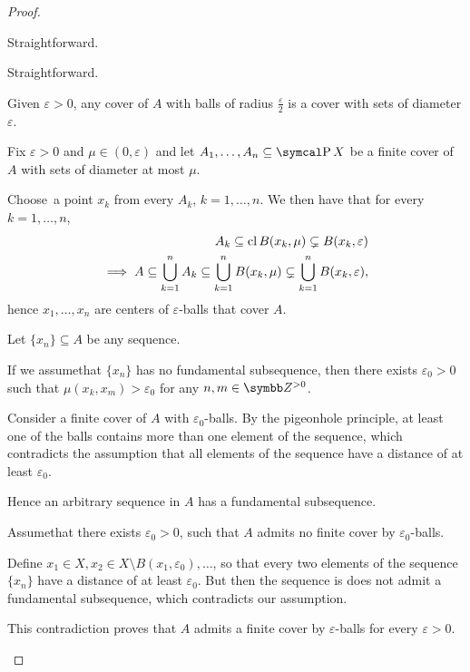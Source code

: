 \begin{proof}
  \begin{description}
     Straightforward.

     Straightforward.

     Given \( \varepsilon > 0 \), any cover of \( A \) with balls of radius \( \frac \varepsilon 2 \) is a cover with sets of diameter \( \varepsilon \).

     Fix \( \varepsilon > 0 \) and \( \mu \in (0, \varepsilon) \) and let \( A_1, \ldots, A_n \subseteq \Power X \) be a finite cover of \( A \) with sets of diameter at most \( \mu \).

    Choose\AOC~a point \( x_k \) from every \( A_k \), \( k = 1, \ldots, n \). We then have that for every \( k = 1, \ldots, n \),
    \begin{align*}
      A_k \subseteq \operatorname{cl} B(x_k, \mu) \subsetneq B(x_k, \varepsilon)
      \\
      \implies A \subseteq \bigcup_{k=1}^n A_k \subseteq \bigcup_{k=1}^n B(x_k, \mu) \subsetneq \bigcup_{k=1}^n B(x_k, \varepsilon),
    \end{align*}
    hence \( x_1, \ldots, x_n \) are centers of \( \varepsilon \)-balls that cover \( A \).

     Let \( \{ x_n \} \subseteq A \) be any sequence.

    If we assume\LEM that \( \{ x_n \} \) has no fundamental subsequence, then there exists \( \varepsilon_0 > 0 \) such that \( \mu(x_k, x_m) > \varepsilon_0 \) for any \( n, m \in \Z^{>0} \).

    Consider a finite cover of \( A \) with \( \varepsilon_0 \)-balls. By the pigeonhole principle, at least one of the balls contains more than one element of the sequence, which contradicts the assumption that all elements of the sequence have a distance of at least \( \varepsilon_0 \).

    Hence an arbitrary sequence in \( A \) has a fundamental subsequence.

     Assume\LEM that there exists \( \varepsilon_0 > 0 \), such that \( A \) admits no finite cover by \( \varepsilon_0 \)-balls.

    Define \( x_1 \in X, x_2 \in X \setminus B(x_1, \varepsilon_0), \ldots \), so that every two elements of the sequence \( \{ x_n \} \) have a distance of at least \( \varepsilon_0 \). But then the sequence is does not admit a fundamental subsequence, which contradicts our assumption.

    This contradiction proves that \( A \) admits a finite cover by \( \varepsilon \)-balls for every \( \varepsilon > 0 \).
  \end{description}
\end{proof}

